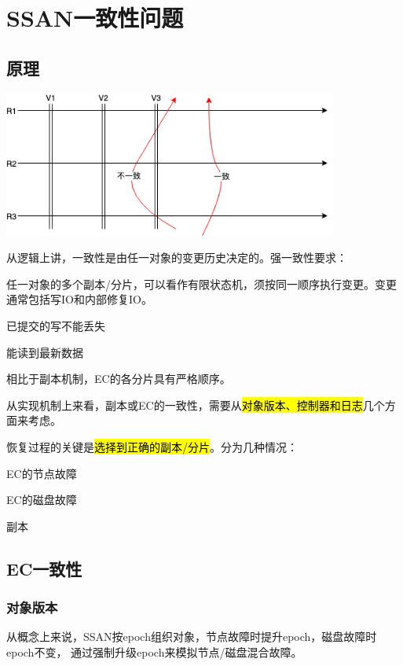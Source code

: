 \chapter{SSAN一致性问题}

\section{原理}

\includegraphics[width=11cm]{../imgs/consistency-splice.png}

从逻辑上讲，一致性是由任一对象的变更历史决定的。强一致性要求：
\begin{enumbox}
\item 任一对象的多个副本/分片，可以看作有限状态机，须按同一顺序执行变更。变更通常包括写IO和内部修复IO。
\item 已提交的写不能丢失
\item 能读到最新数据
\end{enumbox}

相比于副本机制，EC的各分片具有严格顺序。

从实现机制上来看，副本或EC的一致性，需要从\hl{对象版本、控制器和日志}几个方面来考虑。

恢复过程的关键是\hl{选择到正确的副本/分片}。分为几种情况：
\begin{enumbox}
\item EC的节点故障
\item EC的磁盘故障
\item 副本
\end{enumbox}

\section{EC一致性}

\subsection{对象版本}

从概念上来说，SSAN按epoch组织对象，节点故障时提升epoch，磁盘故障时epoch不变，
通过强制升级epoch来模拟节点/磁盘混合故障。

